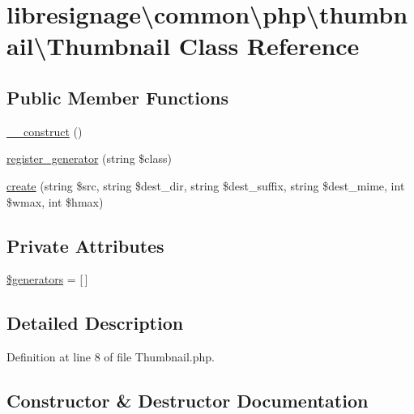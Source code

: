 \hypertarget{classlibresignage_1_1common_1_1php_1_1thumbnail_1_1Thumbnail}{}\section{libresignage\textbackslash{}common\textbackslash{}php\textbackslash{}thumbnail\textbackslash{}Thumbnail Class Reference}
\label{classlibresignage_1_1common_1_1php_1_1thumbnail_1_1Thumbnail}
\subsection*{Public Member Functions}
\begin{DoxyCompactItemize}
\item 
\hyperlink{classlibresignage_1_1common_1_1php_1_1thumbnail_1_1Thumbnail_a7f14034d10d4c00f0679f9c66779540b}{\+\_\+\+\_\+construct} ()
\item 
\hyperlink{classlibresignage_1_1common_1_1php_1_1thumbnail_1_1Thumbnail_af34a9d1bc7b74af58a4726707c047cc0}{register\+\_\+generator} (string \$class)
\item 
\hyperlink{classlibresignage_1_1common_1_1php_1_1thumbnail_1_1Thumbnail_af6131c8ce760226849679fe4d7bcb2a5}{create} (string \$src, string \$dest\+\_\+dir, string \$dest\+\_\+suffix, string \$dest\+\_\+mime, int \$wmax, int \$hmax)
\end{DoxyCompactItemize}
\subsection*{Private Attributes}
\begin{DoxyCompactItemize}
\item 
\hyperlink{classlibresignage_1_1common_1_1php_1_1thumbnail_1_1Thumbnail_aa6f11980ef1146172634c5fa8cd716a1}{\$generators} = \mbox{[}$\,$\mbox{]}
\end{DoxyCompactItemize}


\subsection{Detailed Description}


Definition at line 8 of file Thumbnail.\+php.



\subsection{Constructor \& Destructor Documentation}
\mbox{\label{classlibresignage_1_1common_1_1php_1_1thumbnail_1_1Thumbnail_a7f14034d10d4c00f0679f9c66779540b}} 
